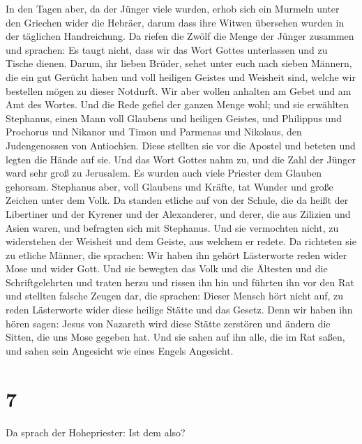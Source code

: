  In den Tagen aber, da der Jünger viele wurden, erhob sich
ein Murmeln unter den Griechen wider die Hebräer, darum dass ihre Witwen
übersehen wurden in der täglichen Handreichung.  Da riefen
die Zwölf die Menge der Jünger zusammen und sprachen: Es taugt nicht,
dass wir das Wort Gottes unterlassen und zu Tische dienen.
 Darum, ihr lieben Brüder, sehet unter euch nach sieben
Männern, die ein gut Gerücht haben und voll heiligen Geistes und
Weisheit sind, welche wir bestellen mögen zu dieser Notdurft.
 Wir aber wollen anhalten am Gebet und am Amt des Wortes.
 Und die Rede gefiel der ganzen Menge wohl; und sie
erwählten Stephanus, einen Mann voll Glaubens und heiligen Geistes, und
Philippus und Prochorus und Nikanor und Timon und Parmenas und Nikolaus,
den Judengenossen von Antiochien.  Diese stellten sie vor
die Apostel und beteten und legten die Hände auf sie.  Und
das Wort Gottes nahm zu, und die Zahl der Jünger ward sehr groß zu
Jerusalem. Es wurden auch viele Priester dem Glauben gehorsam.
 Stephanus aber, voll Glaubens und Kräfte, tat Wunder und
große Zeichen unter dem Volk.  Da standen etliche auf von
der Schule, die da heißt der Libertiner und der Kyrener und der
Alexanderer, und derer, die aus Zilizien und Asien waren, und befragten
sich mit Stephanus.  Und sie vermochten nicht, zu
widerstehen der Weisheit und dem Geiste, aus welchem er redete.
 Da richteten sie zu etliche Männer, die sprachen: Wir
haben ihn gehört Lästerworte reden wider Mose und wider Gott.
 Und sie bewegten das Volk und die Ältesten und die
Schriftgelehrten und traten herzu und rissen ihn hin und führten ihn vor
den Rat  und stellten falsche Zeugen dar, die sprachen:
Dieser Mensch hört nicht auf, zu reden Lästerworte wider diese heilige
Stätte und das Gesetz.  Denn wir haben ihn hören sagen:
Jesus von Nazareth wird diese Stätte zerstören und ändern die Sitten,
die uns Mose gegeben hat.  Und sie sahen auf ihn alle,
die im Rat saßen, und sahen sein Angesicht wie eines Engels Angesicht.

\hypertarget{section-6}{%
\section{7}\label{section-6}}

 Da sprach der Hohepriester: Ist dem also?

